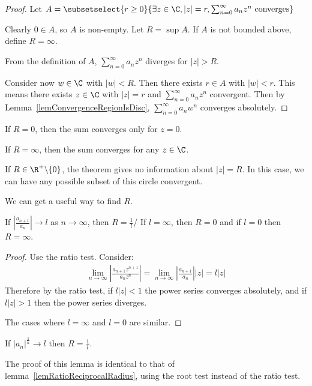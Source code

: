 \documentclass[../Main.tex]{subfiles}
\begin{document}
\begin{proof}
    Let $A = \subsetselect{r \geq 0}{\exists z \in \C, |z| = r, \sum_{n=0}^\infty a_n z^n \text{ converges}}$\par
    Clearly $0 \in A$, so $A$ is non-empty. Let $R = \sup{A}$. If $A$ is not bounded above, define $R = \infty$.\par
    From the definition of $A$, $\sum_{n=0}^\infty a_n z^n$ diverges for $|z| > R$.\par
    Consider now $w \in \C$ with $|w| < R$. Then there exists $r \in A$ with $|w| < r$. This means there exists $z \in \C$ with $|z| = r$ and $\sum_{n=0}^\infty a_n z^n$ convergent. Then by Lemma~\ref{lemConvergenceRegionIsDisc}, $\sum_{n=0}^\infty a_n w^n$ converges absolutely.
\end{proof}
\begin{remarks}
    \item If $R = 0$, then the sum converges only for $z = 0$.
    \item If $R = \infty$, then the sum converges for any $z \in \C$.
    \item If $R \in \R^+ \backslash \{0\}$, the theorem gives no information about $|z| = R$. In this case, we can have any possible subset of this circle convergent.
\end{remarks}
We can get a useful way to find $R$.
\begin{lemma}
    If $\left|\frac{a_{n+1}}{a_n}\right| \to l$ as $n \to \infty$, then $R = \frac{1}{l}$/ If $l = \infty$, then $R = 0$ and if $l = 0$ then $R = \infty$.
    \label{lemRatioReciprocalRadius}
\end{lemma}
\begin{proof}
    Use the ratio test. Consider:
    \begin{align*}
	\lim_{n \to \infty} \left|\frac{a_{n+1} z^{n+1}}{a_n z^n}\right| = \lim_{n \to \infty} \left|\frac{a_{n+1}}{a_n}\right| |z| = l|z|
    \end{align*}
    Therefore by the ratio test, if $l|z| < 1$ the power series converges absolutely, and if $l|z| > 1$ then the power series diverges.\par
    The cases where $l = \infty$ and $l = 0$ are similar.
\end{proof}
\begin{lemma}
    If $|a_n|^\frac{1}{n} \to l$ then $R = \frac{1}{l}$.
    \label{lemRootReciprocalRadius}
\end{lemma}
The proof of this lemma is identical to that of lemma~\ref{lemRatioReciprocalRadius}, using the root test instead of the ratio test.
\end{document}
